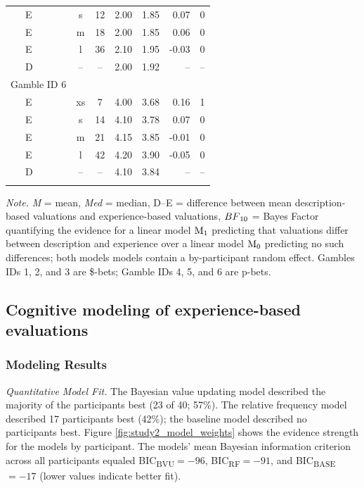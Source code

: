 \documentclass[a4paper, man, floatsintext]{apa6}
\begin{document}
\begin{table}[tbp]
\begin{center}
\begin{threeparttable}
\begin{tabular}{lccccrr}
\ \ \ E & s & 12 & 2.00 & 1.85 & 0.07 & 0\\
\ \ \ E & m & 18 & 2.00 & 1.85 & 0.06 & 0\\
\ \ \ E & l & 36 & 2.10 & 1.95 & -0.03 & 0\\
\ \ \ D & -- & -- & 2.00 & 1.92 & -- & --\\
Gamble ID 6 &  &  &  &  &  & \\
\ \ \ E & xs & 7 & 4.00 & 3.68 & 0.16 & 1\\
\ \ \ E & s & 14 & 4.10 & 3.78 & 0.07 & 0\\
\ \ \ E & m & 21 & 4.15 & 3.85 & -0.01 & 0\\
\ \ \ E & l & 42 & 4.20 & 3.90 & -0.05 & 0\\
\ \ \ D & -- & -- & 4.10 & 3.84 & -- & --\\
\bottomrule
\addlinespace
\end{tabular}
\begin{tablenotes}[para]
\normalsize{\textit{Note.} \textit{M} = mean, \textit{Med} = median, D--E = difference between mean description-based valuations and experience-based valuations, $BF\textsubscript{10}$ = Bayes Factor quantifying the evidence for a linear model $\mathrm{M}\textsubscript{1}$ predicting that valuations differ between description and experience over a linear model $\mathrm{M}\textsubscript{0}$ predicting no such differences; both models models contain a by-participant random effect. Gambles IDs 1, 2, and 3 are \$-bets; Gamble IDs 4, 5, and 6 are p-bets.}
\end{tablenotes}
\end{threeparttable}
\end{center}
\end{table}

\subsection{Cognitive modeling of experience-based evaluations}

\subsubsection{Modeling Results}

\textit{Quantitative Model Fit.} The Bayesian value updating model
described the majority of the participants best (23 of 40; 57\%). The
relative frequency model described 17 participants best (42\%); the
baseline model described no participants best. Figure
\ref{fig:study2_model_weights} shows the evidence strength for the
models by participant. The models' mean Bayesian information criterion
across all participants equaled BIC\textsubscript{BVU}\(= -96\),
BIC\textsubscript{RF}\(= -91\), and BIC\textsubscript{BASE}\(= -17\)
(lower values indicate better fit).
\end{document}
